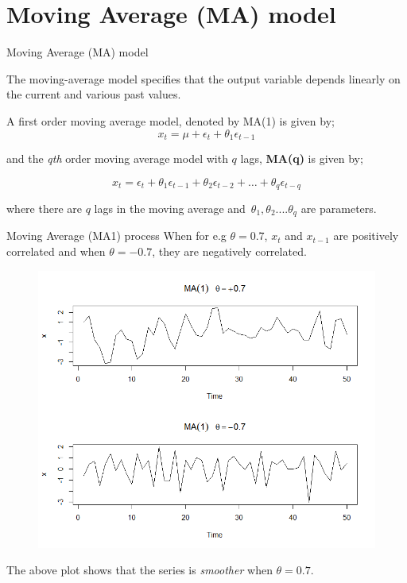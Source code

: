 \documentclass{beamer}
\begin{document}
\section{Moving Average (MA) model}
\begin{frame}{Moving Average (MA) model}

The moving-average model specifies that the output variable depends linearly on the current and various past values.
	
A first order moving average model, denoted by MA(1) is	given by; 
\begin{equation*}
x_t =\mu + \epsilon_t +\theta_1\epsilon_{t-1}
\end{equation*}

and the \textit{qth} order moving average model with $ q $ lags, \textbf{MA(q)} is given by; 

\begin{equation*}
x_t = \epsilon_t +\theta_1\epsilon_{t-1}+\theta_2\epsilon_{t-2}+\dots + \theta_q\epsilon_{t-q}
\end{equation*}

where there are $ q $ lags in the moving average and $ \,\theta_1,\theta_2....\theta_q $ are parameters. 

\end{frame}



\begin{frame}{Moving Average (MA1) process}
\small{When for e.g $ \theta = 0.7 $,  $ x_t $ and $ x_{t-1} $ are positively correlated and when $ \theta = - 0.7 $, they are negatively correlated. }
\begin{figure}
\centering
\includegraphics[width=0.65\linewidth]{ma1}
\end{figure}
\tiny{The above plot shows that the series is \textit{smoother} when $ \theta = 0.7 $. }

\end{frame}
\end{document}
